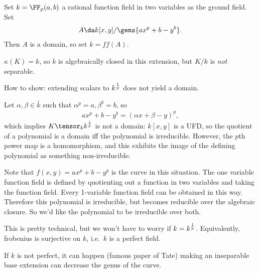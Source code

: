 \begin{example}

\label{technical_example} Set \(k = \FF_p(a, b)\) a rational function
field in two variables as the ground field. Set
\begin{align*}  
A \da k[x, y]/ \gens{ax^p + b-y^b}
.\end{align*} Then \(A\) is a domain, so set \(k = ff(A)\).

\begin{claim}

\(\kappa(K) = k\), so \(k\) is algebraically closed in this extension,
but \(K/k\) is \emph{not} separable.

\end{claim}

How to show: extending scalars to \(k^{1\over p}\) does not yield a
domain.

Let \(\alpha, \beta \in \bar k\) such that
\(\alpha^p = a, \beta^b = b\), so
\begin{align*}  
ax^p + b-y^b = (\alpha x + \beta - y)^p
,\end{align*} which implies \(K \tensor_k k^{1\over p}\) is not a
domain: \(k[x, y]\) is a UFD, so the quotient of a polynomial is a
domain iff the polynomial is irreducible. However, the \(p\)th power map
is a homomorphism, and this exhibits the image of the defining
polynomial as something non-irreducible.

\end{example}

\begin{remark}

Note that \(f(x, y) = ax^p + b - y^p\) is the curve in this situation.
The one variable function field is defined by quotienting out a function
in two variables and taking the function field. Every 1-variable
function field can be obtained in this way. Therefore this polynomial is
irreducible, but becomes reducible over the algebraic closure. So we'd
like the polynomial to be irreducible over both.

\end{remark}

\begin{remark}

This is pretty technical, but we won't have to worry if
\(k = k^{1\over p}\). Equivalently, frobenius is surjective on \(k\),
i.e.~\(k\) is a perfect field.

If \(k\) is not perfect, it can happen (famous paper of Tate) making an
inseparable base extension can decrease the genus of the curve.

\end{remark}

